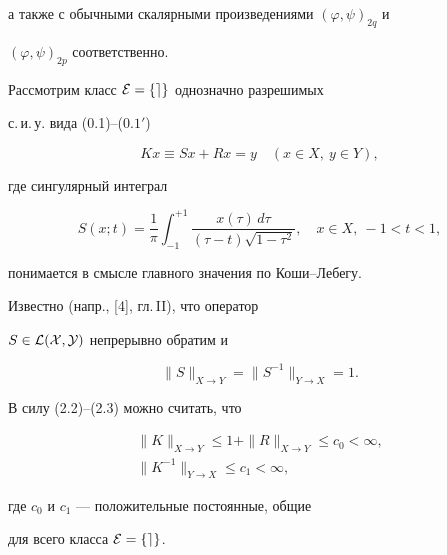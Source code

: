 а также с обычными скалярными произведениями $(\varphi ,\psi )_{2q}$ и


$(\varphi ,\psi )_{2p}$ соответственно.





Рассмотрим класс $\cal E=\{ e\}$ однозначно разрешимых


с.\,и.\,у. вида (0.1)--($0.1'$)


\begin{equation}


Kx\equiv Sx+Rx=y\quad (x\in X,\ y\in Y),


\end{equation}


где сингулярный интеграл


\begin{equation}


S(x;t)=\frac{1}{\pi}\int_{-1}^{+1}\frac{x(\tau)\, d\tau}{(\tau -t)


\sqrt{1-\tau^2}},\quad x\in X,\ -1<t<1,


\end{equation}


понимается в смысле главного значения по Коши--Лебегу.





Известно (напр., [4], гл.\,II), что оператор


$S\in \cal L(X,Y)$ непрерывно обратим и


\begin{equation}


\|S\|_{X\rightarrow Y}=\|S^{-1}\|_{Y\rightarrow X}=1.


\end{equation}


В силу (2.2)--(2.3) можно считать, что


\begin{gather}


\|K\|_{X\rightarrow Y}\leq 1+\|R\|_{X\rightarrow Y}\leq c_0<\infty, \\


%


\|K^{-1}\|_{Y\rightarrow X}\leq c_1<\infty,


\end{gather}


где $c_0$ и $c_1$ --- положительные постоянные, общие


для всего класса $\cal E=\{ e\}$.





